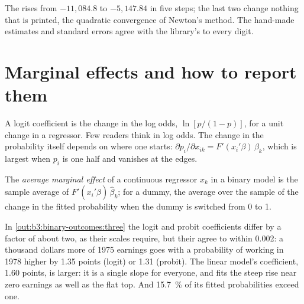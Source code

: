 \label{out:b3:binary-outcomes:newton}

The  rises from $-11{,}084.8$ to $-5{,}147.84$ in five steps; the
last two change nothing that is printed, the quadratic convergence of
Newton's method. The hand-made estimates and standard errors agree with the
library's to every digit. %

\section{Marginal effects and how to report them}\label{sec:b3:binary-outcomes:marginal}

A logit coefficient is the change in the log odds, $\ln[p/(1 - p)]$, for a unit
change in a regressor. Few readers think in log odds. The change in the
probability itself depends on where one starts: $\partial p_i/\partial x_{ik} =
F'(x_i'\beta)\,\beta_k$, which is largest when $p_i$ is one half and vanishes at
the edges.

\begin{definition}\label{def:b3:binary-outcomes:ame}
The \emph{average marginal effect} of a continuous regressor $x_k$ in a binary
model is the sample average of $F'(x_i'\hat\beta)\,\hat\beta_k$; for a dummy, the
average over the sample of the change in the fitted probability when the dummy
is switched from 0 to 1.
\end{definition}

In \cref{out:b3:binary-outcomes:three} the logit and probit coefficients differ
by a factor of about two, as their scales require, but their  agree to within 0.002: a thousand dollars more of 1975 earnings goes with
a probability of working in 1978 higher by 1.35 points (logit) or 1.31 (probit).
The linear model's coefficient, 1.60 points, is larger: it is a single slope
for everyone, and fits the steep rise near zero earnings as well as the flat top.
And 15.7~\% of its fitted probabilities exceed one. %

